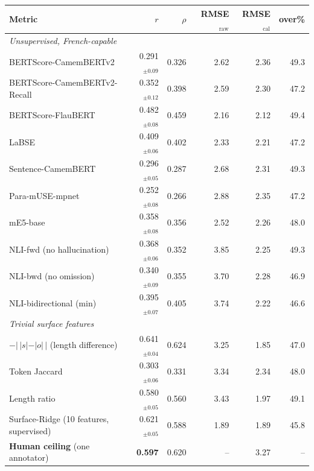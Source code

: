 \begin{tabular}{lrrrrr}
\toprule
Metric & $r$ & $\rho$ & RMSE$_{\text{raw}}$ & RMSE$_{\text{cal}}$ & over\% \\
\midrule
\multicolumn{6}{l}{\emph{Unsupervised, French-capable}}\\
BERTScore-CamemBERTv2 & 0.291$_{\pm0.09}$ & 0.326 & 2.62 & 2.36 & 49.3 \\
BERTScore-CamemBERTv2-Recall & 0.352$_{\pm0.12}$ & 0.398 & 2.59 & 2.30 & 47.2 \\
BERTScore-FlauBERT & 0.482$_{\pm0.08}$ & 0.459 & 2.16 & 2.12 & 49.4 \\
LaBSE & 0.409$_{\pm0.06}$ & 0.402 & 2.33 & 2.21 & 47.2 \\
Sentence-CamemBERT & 0.296$_{\pm0.05}$ & 0.287 & 2.68 & 2.31 & 49.3 \\
Para-mUSE-mpnet & 0.252$_{\pm0.08}$ & 0.266 & 2.88 & 2.35 & 47.2 \\
mE5-base & 0.358$_{\pm0.08}$ & 0.356 & 2.52 & 2.26 & 48.0 \\
NLI-fwd (no hallucination) & 0.368$_{\pm0.06}$ & 0.352 & 3.85 & 2.25 & 49.3 \\
NLI-bwd (no omission) & 0.340$_{\pm0.09}$ & 0.355 & 3.70 & 2.28 & 46.9 \\
NLI-bidirectional (min) & 0.395$_{\pm0.07}$ & 0.405 & 3.74 & 2.22 & 46.6 \\
\midrule
\multicolumn{6}{l}{\emph{Trivial surface features}}\\
$-|\,|s|-|o|\,|$ (length difference) & 0.641$_{\pm0.04}$ & 0.624 & 3.25 & 1.85 & 47.0 \\
Token Jaccard & 0.303$_{\pm0.06}$ & 0.331 & 3.34 & 2.34 & 48.0 \\
Length ratio & 0.580$_{\pm0.05}$ & 0.560 & 3.43 & 1.97 & 49.1 \\
Surface-Ridge (10 features, supervised) & 0.621$_{\pm0.05}$ & 0.588 & 1.89 & 1.89 & 45.8 \\
\midrule
\textbf{Human ceiling} (one annotator) & \textbf{0.597} & 0.620 & -- & 3.27 & -- \\
\bottomrule
\end{tabular}